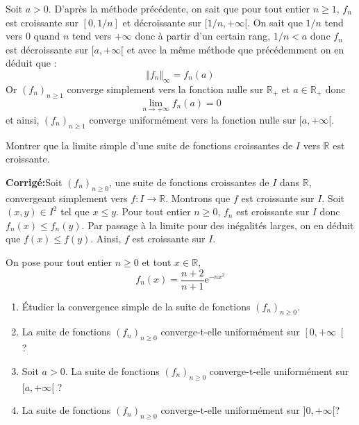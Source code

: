 \documentclass[a4paper,twoside,french,11pt]{VcCours}
\newcommand{\corr}{\textbf{Corrigé:}}
\begin{document}
\begin{enumerate}
Soit $a>0$. D'après la méthode précédente, on sait que pour tout entier $n \geq 1$, $f_n$ est croissante sur $[0,1/n]$ et décroissante sur $[1/n, + \infty[$. On sait que $1/n$ tend vers $0$ quand $n$ tend vers $+ \infty$ donc à partir d'un certain rang, $1/n<a$ donc $f_n$ est décroissante sur $[a, + \infty[$ et avec la même méthode que précédemment on en déduit que :
$$  \Vert f_n \Vert_{\infty} = f_n(a)$$
Or $(f_n)_{n \geq 1}$ converge simplement vers la fonction nulle sur $\mathbb{R}_+$ et $a \in \mathbb{R}_+$ donc 
$$ \lim_{n \rightarrow + \infty} f_n(a) = 0$$
et ainsi, $(f_n)_{n \geq 1}$ converge uniformément vers la fonction nulle sur $[a, + \infty[$.

\end{enumerate}

\medskip


\begin{Exercice}{} Montrer que la limite simple d'une suite de fonctions croissantes de $I$ vers $\mathbb{R}$ est croissante.
\end{Exercice}

\corr Soit $(f_n)_{n \geq 0}$, une suite de fonctions croissantes de $I$ dans $\mathbb{R}$, convergeant simplement vers $f : I \rightarrow \mathbb{R}$. Montrons que $f$ est croissante sur $I$. Soit $(x,y) \in I^2$ tel que $x \leq y$. Pour tout entier $n \geq 0$, $f_n$ est croissante sur $I$ donc $f_n(x) \leq f_n(y)$. Par passage à la limite pour des inégalités larges, on en déduit que $f(x) \leq f(y)$. Ainsi, $f$ est croissante sur $I$.

\medskip

\begin{Exercice}{} On pose pour tout entier $n \geq 0$ et tout $x \in \mathbb{R}$,
$$f_{n}(x) =\dfrac{n+2}{n+1}\mathrm{e}^{-n x^{2}}$$
\begin{enumerate}
\item Étudier la convergence simple de la suite de fonctions $\left(f_{n}\right) _{n \geq 0}$.
\item La suite de fonctions  $\left(f_{n}\right) _{n \geq 0}$ converge-t-elle uniformément sur $\left[ 0,+\infty\right[$ ?
\item Soit $a>0$. La suite de fonctions $\left(f_{n}\right) _{n \geq 0}$ converge-t-elle uniformément sur  $[a,+\infty[$ ?	
\item La suite de fonctions  $\left(f_{n}\right) _{n \geq 0}$ converge-t-elle uniformément sur $]0,+\infty[$? 
\end{enumerate}
\end{Exercice}
\end{document}
